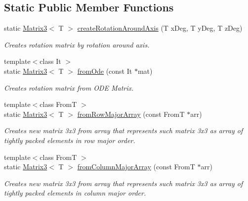 \subsection*{Static Public Member Functions}
\begin{DoxyCompactItemize}
\item 
static \hyperlink{class_matrix3}{Matrix3}$<$ T $>$ \hyperlink{class_matrix3_a1e39496a1d1708ddc1658b0bf2f448f2}{createRotationAroundAxis} (T xDeg, T yDeg, T zDeg)
\begin{DoxyCompactList}\small\item\em Creates rotation matrix by rotation around axis. \item\end{DoxyCompactList}\item 
{\footnotesize template$<$class It $>$ }\\static \hyperlink{class_matrix3}{Matrix3}$<$ T $>$ \hyperlink{class_matrix3_af183cabaf18b9922fd11e517c5cf26b1}{fromOde} (const It $\ast$mat)
\begin{DoxyCompactList}\small\item\em Creates rotation matrix from ODE Matrix. \item\end{DoxyCompactList}\item 
{\footnotesize template$<$class FromT $>$ }\\static \hyperlink{class_matrix3}{Matrix3}$<$ T $>$ \hyperlink{class_matrix3_abce4ed104a81e64ce9cbd479f0105625}{fromRowMajorArray} (const FromT $\ast$arr)
\begin{DoxyCompactList}\small\item\em Creates new matrix 3x3 from array that represents such matrix 3x3 as array of tightly packed elements in row major order. \item\end{DoxyCompactList}\item 
{\footnotesize template$<$class FromT $>$ }\\static \hyperlink{class_matrix3}{Matrix3}$<$ T $>$ \hyperlink{class_matrix3_a54ac5b79264837228f219067e92aa853}{fromColumnMajorArray} (const FromT $\ast$arr)
\begin{DoxyCompactList}\small\item\em Creates new matrix 3x3 from array that represents such matrix 3x3 as array of tightly packed elements in column major order. \item\end{DoxyCompactList}\end{DoxyCompactItemize}
